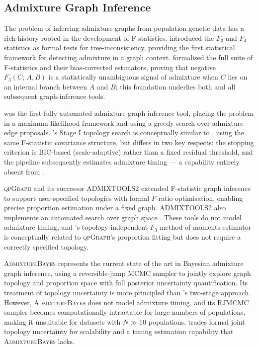 
\subsection*{Admixture Graph Inference}

The problem of inferring admixture graphs from population genetic data has
a rich history rooted in the development of F-statistics.
\citet{Reich2009} introduced the $F_3$ and $F_4$ statistics as formal tests
for tree-inconsistency, providing the first statistical framework for
detecting admixture in a graph context.
\citet{Patterson2012} formalised the full suite of F-statistics and their
bias-corrected estimators, proving that negative $F_3(C;\,A,B)$ is a
statistically unambiguous signal of admixture when $C$ lies on an internal
branch between $A$ and $B$; this foundation underlies both \hapgraph{} and
all subsequent graph-inference tools.

\treemix{} \citep{Pickrell2012} was the first fully automated admixture
graph inference tool, placing the problem in a maximum-likelihood framework
and using a greedy search over admixture edge proposals.
\hapgraph{}'s Stage I topology search is conceptually similar to \treemix{},
using the same F-statistic covariance structure, but differs in two key
respects: the stopping criterion is BIC-based (scale-adaptive) rather than
a fixed residual threshold, and the pipeline subsequently estimates
admixture timing — a capability entirely absent from \treemix{}.

\textsc{qpGraph} \citep{Haak2015} and its successor \textsc{ADMIXTOOLS2}
\citep{Maier2023} extended F-statistic graph inference to support user-specified
topologies with formal $F$-ratio optimisation, enabling precise proportion
estimation under a fixed graph.
\textsc{ADMIXTOOLS2} also implements an automated search over graph space
\citep{Maier2023}.
These tools do not model admixture timing, and \hapgraph{}'s topology-independent
$F_3$ method-of-moments estimator is conceptually related to \textsc{qpGraph}'s
proportion fitting but does not require a correctly specified topology.

\textsc{AdmixtureBayes} \citep{Nielsen2023} represents the current state of
the art in Bayesian admixture graph inference, using a reversible-jump MCMC
sampler to jointly explore graph topology and proportion space with full
posterior uncertainty quantification.
Its treatment of topology uncertainty is more principled than \hapgraph{}'s
two-stage approach.
However, \textsc{AdmixtureBayes} does not model admixture timing, and its
RJMCMC sampler becomes computationally intractable for large numbers of
populations, making it unsuitable for datasets with $N \gg 10$ populations.
\hapgraph{} trades formal joint topology uncertainty for scalability and a
timing estimation capability that \textsc{AdmixtureBayes} lacks.

